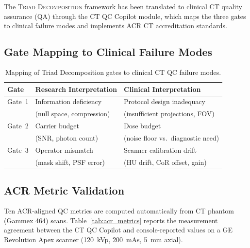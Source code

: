 \documentclass[11pt]{article}
\theoremstyle{definition}
\begin{document}
The \textsc{Triad Decomposition} framework has been translated to clinical
CT quality assurance (QA) through the CT QC Copilot module, which maps
the three gates to clinical failure modes and implements ACR CT
accreditation standards.

\subsection{Gate Mapping to Clinical Failure Modes}

\begin{table}[htbp]
\centering
\caption{Mapping of Triad Decomposition gates to clinical CT QC failure modes.}
\label{tab:gate_mapping}
\begin{tabular}{l l l}
\toprule
\textbf{Gate} & \textbf{Research Interpretation} & \textbf{Clinical Interpretation} \\
\midrule
Gate~1 & Information deficiency       & Protocol design inadequacy \\
       & (null space, compression)     & (insufficient projections, FOV) \\
\midrule
Gate~2 & Carrier budget               & Dose budget \\
       & (SNR, photon count)          & (noise floor vs.\ diagnostic need) \\
\midrule
Gate~3 & Operator mismatch            & Scanner calibration drift \\
       & (mask shift, PSF error)      & (HU drift, CoR offset, gain) \\
\bottomrule
\end{tabular}
\end{table}

\subsection{ACR Metric Validation}

Ten ACR-aligned QC metrics are computed automatically from CT phantom
(Gammex 464) scans.  Table~\ref{tab:acr_metrics} reports the measurement
agreement between the CT QC Copilot and console-reported values on a GE
Revolution Apex scanner (120~kVp, 200~mAs, 5~mm axial).
\end{document}
